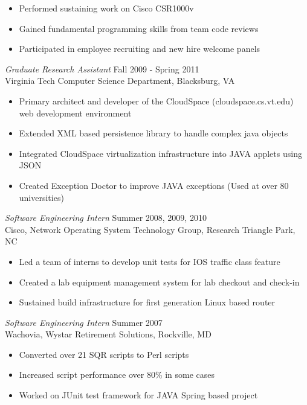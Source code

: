 \documentclass[line,margin]{res}
\begin{document}
\begin{resume}
\begin{itemize}
             \item Performed sustaining work on Cisco CSR1000v
             \item Gained fundamental programming skills from team code reviews
             \item Participated in employee recruiting and new hire welcome panels
        \end{itemize}
        {\sl Graduate Research Assistant} \hfill  Fall 2009 - Spring 2011 \\
        Virginia Tech Computer Science Department, Blacksburg, VA
        \begin{itemize} \itemsep -2pt
            \item Primary architect and developer of the CloudSpace (cloudspace.cs.vt.edu) web development environment
            \item Extended XML based persistence library to handle complex java objects
            \item Integrated CloudSpace virtualization infrastructure into JAVA applets using JSON
            \item Created Exception Doctor to improve JAVA exceptions (Used at over 80 universities)
        \end{itemize}
        {\sl Software Engineering Intern} \hfill  Summer 2008, 2009, 2010 \\
           Cisco, Network Operating System Technology Group, Research Triangle Park, NC
              \begin{itemize}  \itemsep -2pt
                   \item Led a team of interns to develop unit tests for IOS traffic class feature
                   \item Created a lab equipment management system for lab checkout and check-in
                   \item Sustained build infrastructure for first generation Linux based router
              \end{itemize}
        {\sl Software Engineering Intern} \hfill  Summer 2007 \\
           Wachovia, Wystar Retirement Solutions, Rockville, MD
              \begin{itemize}  \itemsep -2pt %
                   \item Converted over 21 SQR scripts to Perl scripts
                   \item Increased script performance over 80\% in some cases
                   \item Worked on JUnit test framework for JAVA Spring based project
              \end{itemize}
 

\end{resume}
\end{document}
